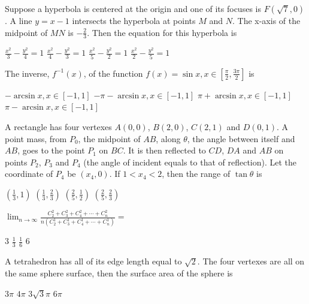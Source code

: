 \documentclass[letterpaper,10pt,addpoints]{exam}
\begin{document}
\begin{questions}
\question
Suppose a hyperbola is centered at the origin and one of its focuses is $F(\sqrt{7},0)$. A line $y=x-1$ intersects the hyperbola at points $M$ and $N$. The x-axis of the midpoint of $MN$ is $-\frac{2}{3}$. Then the equation for this hyperbola is
\begin{choices}
\choice $\frac{x^{2}}{3}-\frac{y^{2}}{4}=1$
\choice $\frac{x^{2}}{4}-\frac{y^{2}}{3}=1$
\choice $\frac{x^{2}}{5}-\frac{y^{2}}{2}=1$
\choice $\frac{x^{2}}{2}-\frac{y^{2}}{5}=1$
\end{choices}

\question
The inverse, $f^{-1}(x)$, of the function $f(x)=\sin x, x \in\left[\frac{\pi}{2}, \frac{3 \pi}{2}\right]$ is
\begin{choices}
\choice $-\arcsin x,x \in[-1,1]$
\choice $-\pi-\arcsin x,x \in[-1,1]$
\choice $\pi+\arcsin x,x \in[-1,1]$
\choice $\pi-\arcsin x,x \in[-1,1]$
\end{choices}

\question
A rectangle has four vertexes $A(0,0)$, $B(2,0)$, $C(2,1)$ and $D(0,1)$. A point mass, from $P_0$, the midpoint of $AB$, along $\theta$, the angle between itself and $AB$, goes to the point $P_1$ on $BC$. It is then reflected to $CD$, $DA$ and $AB$ on points $P_2$, $P_3$ and $P_4$ (the angle of incident equals to that of reflection). Let the coordinate of $P_4$ be $(x_4,0)$. If $1<x_{4}<2$, then the range of $\tan\theta$ is
\begin{choices}
\choice $\left(\frac{1}{3}, 1\right)$
\choice $\left(\frac{1}{3}, \frac{2}{3}\right)$
\choice $\left(\frac{2}{5}, \frac{1}{2}\right)$
\choice $\left(\frac{2}{5}, \frac{2}{3}\right)$
\end{choices}

\question
$\displaystyle \lim _{n \rightarrow \infty} \frac{C_{2}^{2}+C_{3}^{2}+C_{4}^{2}+\cdots+C_{n}^{2}}{n\left(C_{2}^{1}+C_{3}^{1}+C_{4}^{1}+\cdots+C_{n}^{1}\right)}=$
\begin{choices}
\choice $3$
\choice $\frac{1}{3}$
\choice $\frac{1}{6}$
\choice $6$
\end{choices}

\question
A tetrahedron has all of its edge length equal to $\sqrt{2}$. The four vertexes are all on the same sphere surface, then the surface area of the sphere is
\begin{choices}
\choice $3\pi$
\choice $4\pi$
\choice $3\sqrt{3}\pi$
\choice $6\pi$
\end{choices}

\xdef\mycounter1{}
\end{questions}
\clearpage
\end{document}
